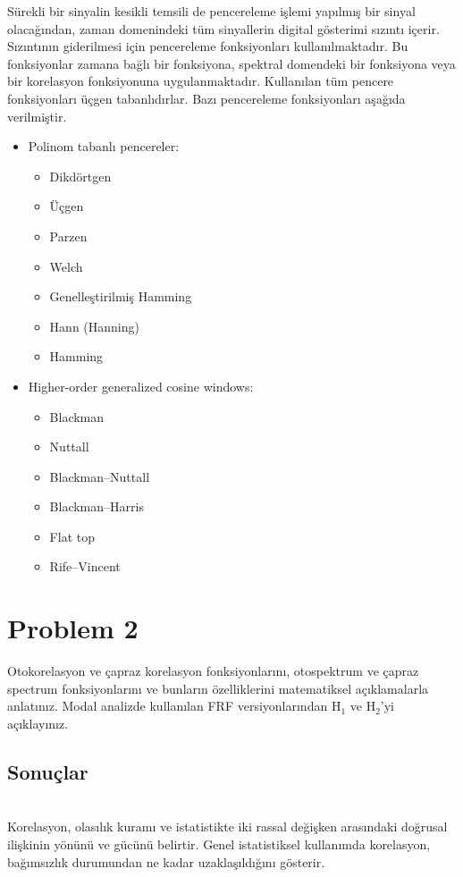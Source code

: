 \documentclass[turkish]{report}
\begin{document}
Sürekli bir sinyalin kesikli temsili de pencereleme işlemi yapılmış bir sinyal olacağından, zaman domenindeki tüm sinyallerin digital gösterimi sızıntı içerir. Sızıntının giderilmesi için pencereleme fonksiyonları kullanılmaktadır. Bu fonksiyonlar zamana bağlı bir fonksiyona, spektral domendeki bir fonksiyona veya bir korelasyon fonksiyonuna uygulanmaktadır\cite{norton2003fundamentals}. Kullanılan tüm pencere fonksiyonları üçgen tabanlıdırlar. Bazı pencereleme fonksiyonları aşağıda verilmiştir\cite{wiki:002}.


\begin{itemize}
\item[]{Polinom tabanlı pencereler:}
\begin{itemize}
\item{ Dikdörtgen}
\item{ Üçgen}
\item{ Parzen }
\item{ Welch}
\item{ Genelleştirilmiş Hamming }
\item{ Hann (Hanning)}
\item{ Hamming}
\end{itemize}

\item[]{Higher-order generalized cosine windows:}
\begin{itemize}
\item Blackman 
\item Nuttall 
\item Blackman–Nuttall 
\item Blackman–Harris 
\item Flat top 
\item Rife–Vincent 
\end{itemize}
\end{itemize}

\section*{Problem 2}
Otokorelasyon ve çapraz korelasyon fonksiyonlarını, otospektrum ve çapraz spectrum fonksiyonlarını ve bunların özelliklerini matematiksel açıklamalarla anlatınız.  Modal  analizde  kullanılan  FRF versiyonlarından $\mathrm{H_1}$ ve $\mathrm{H_2}$'yi açıklayınız.
\begin{center}
\subsection*{Sonuçlar}
\end{center}
~\\
Korelasyon, olasılık kuramı ve istatistikte iki rassal değişken arasındaki doğrusal ilişkinin yönünü ve gücünü belirtir. Genel istatistiksel kullanımda korelasyon, bağımsızlık durumundan ne kadar uzaklaşıldığını gösterir\cite{wikikorelasyon}. 
\\
\end{document}
